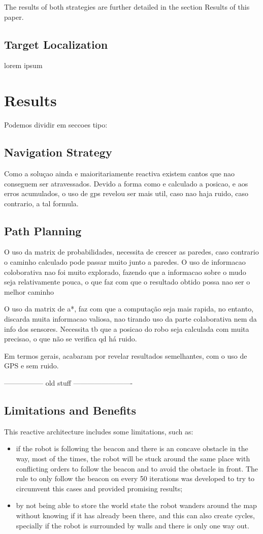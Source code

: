 \documentclass[oribibl]{llncs}
\begin{document}
The results of both strategies are further detailed in the section Results of this paper.

\subsection{Target Localization}
lorem ipsum

\section{Results}
Podemos dividir em seccoes  tipo:

\subsection{Navigation Strategy}
Como a soluçao ainda e maioritariamente reactiva existem cantos que nao conseguem ser atravessados.
Devido a forma como e calculado a posicao, e aos erros acumulados, o uso de gps revelou ser mais util, caso nao haja ruido, caso contrario, a tal formula.

\subsection{Path Planning}
O uso da matrix de probabilidades, necessita de crescer as paredes, caso contrario o caminho calculado pode passar muito junto a paredes.
O uso de informacao coloborativa nao foi muito explorado, fazendo que a informacao sobre o mudo seja relativamente pouca, o que faz com que o resultado obtido possa nao ser o melhor caminho

O uso da matrix de a*, faz com que a computação seja mais rapida, no entanto, discarda muita informacao valiosa, nao tirando uso da parte colaborativa nem da info dos sensores. Necessita tb que a posicao do robo seja calculada com muita precisao, o que não se verifica qd há ruido.

Em termos gerais, acabaram por revelar resultados semelhantes, com o uso de GPS e sem ruido.


----------------- old stuff -------------------------
\subsection{Limitations and Benefits}
This reactive architecture includes some limitations, such as:

\begin{itemize}
  \item if the robot is following the beacon and there is an concave obstacle in the way, most of the times, the robot will be stuck around the same place with conflicting orders to follow the beacon and to avoid the obstacle in front. The rule to only follow the beacon on every 50 iterations was developed to try to circumvent this cases and provided promising results;
  \item by not being able to store the world state the robot wanders around the map without knowing if it has already been there, and this can also create cycles, specially if the robot is surrounded by walls and there is only one way out.
\end{itemize}
\end{document}
